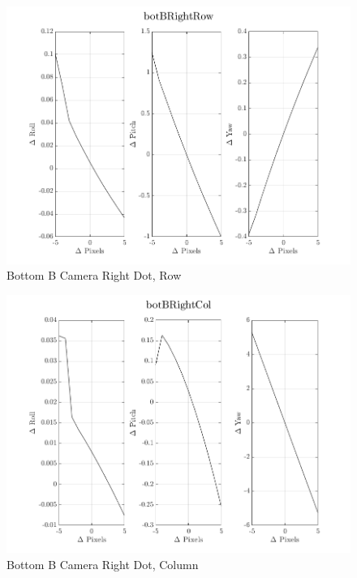\documentclass[12pt]{article}
\begin{document}
\begin{multicols}{2}
\begin{figure}[H]
	\includegraphics[width=0.9\columnwidth]{botBRightRow.png}
	\caption{Bottom B Camera Right Dot, Row\label{fig:botBRightRow}}
\end{figure}

\begin{figure}[H]
	\includegraphics[width=0.9\columnwidth]{botBRightCol.png}
	\caption{Bottom B Camera Right Dot, Column\label{fig:botBRightCol}}
\end{figure}



\end{multicols}
\end{document}
